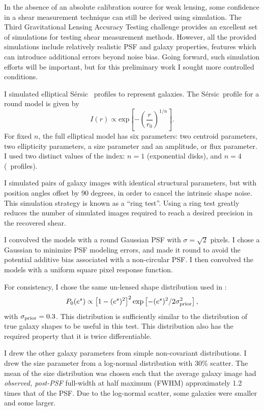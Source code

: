 \documentclass[usegraphicx,usenatbib]{mn2e}
\newcommand{\sersic}{S\'{e}rsic}
\newcommand{\lognormscatt}{30}
\begin{document}
In the absence of an absolute calibration source for weak lensing, some
confidence in a shear measurement technique can still be derived using
simulation.  The Third Gravitational Lensing Accuracy Testing challenge
\citep[GREAT3,][]{great3} provides an excellent set of simulations for testing
shear measurement methods.  However, all the provided simulations include
relatively realistic PSF and galaxy properties, features which can introduce
additional errors beyond noise bias.  Going forward, such simulation efforts
will be important, but for this preliminary work I sought more controlled
conditions.

I simulated elliptical \sersic\ \citep{Sersic63} profiles to represent galaxies.
The \sersic\ profile for a round model is given by
\begin{equation}
I(r) \propto \mathrm{exp} \left[ -\left( \frac{r}{r_0} \right)^{1/n} \right].
\end{equation}
For fixed $n$, the full elliptical model has six parameters: two centroid
parameters, two ellipticity parameters, a size parameter and an amplitude, or
flux parameter.  I used two distinct values of the index: $n=1$ (exponential
disks), and $n=4$ (\devauc\ profiles).  

I simulated pairs of galaxy images with identical structural parameters, but
with position angles offset by 90 degrees, in order to cancel the intrinsic
shape noise.  This simulation strategy is known as a ``ring
test''\citep{Nakajima2007}. Using a ring test greatly reduces the number of
simulated images required to reach a desired precision in the recovered shear.

I convolved the models with a round Gaussian PSF with $\sigma = \sqrt{2}$
pixels.  I chose a Gaussian to minimize PSF modeling errors, and made it round
to avoid the potential additive bias associated with a non-circular PSF.  I
then convolved the models with a uniform square pixel response function.

For consistency, I chose the same un-lensed shape distribution
used in \cite{ba14}:
\begin{equation}
P_0(e^s)\propto \left[1-(e^s)^2\right]^2 \exp\left[-(e^s)^2/2\sigma_{\rm prior}^2\right],
\end{equation}
with $\sigma_{\rm prior}=0.3$. This distribution is sufficiently similar to the
distribution of true galaxy shapes to be useful in this test.  This
distribution also has the required property that it is twice differentiable.

I drew the other galaxy parameters from simple non-covariant distributions.  I
drew the size parameter from a log-normal distribution with \lognormscatt\%
scatter.  The mean of the size distribution was chosen such that the average
galaxy image had {\em observed, post-PSF} full-width at half maximum (FWHM)
approximately 1.2 times that of the PSF.  Due to the log-normal scatter, some
galaxies were smaller and some larger.
\end{document}
